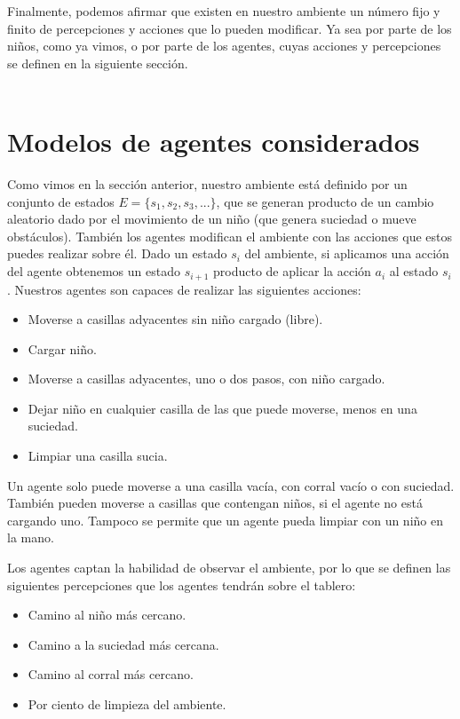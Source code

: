 \documentclass[twoside]{article}
\begin{document}
Finalmente, podemos afirmar que existen en nuestro ambiente un n\'umero fijo y finito de percepciones y acciones que lo pueden modificar. Ya sea por parte de los ni\~nos, como ya vimos, o por parte de los agentes, cuyas acciones y percepciones se definen en la siguiente secci\'on.\\\\

\section{Modelos de agentes considerados}
Como vimos en la secci\'on anterior, nuestro ambiente est\'a definido por un conjunto de estados $E =\{s_1, s_2, s_3,...\}$, que se generan producto de un cambio aleatorio dado por el movimiento de un ni\~no (que genera suciedad o mueve obst\'aculos). Tambi\'en los agentes modifican el ambiente con las acciones que estos puedes realizar sobre \'el. Dado un estado $s_i$ del ambiente, si aplicamos una acci\'on del agente obtenemos un estado $s_{i+1}$ producto de aplicar la acci\'on $a_i$ al estado $s_i$. Nuestros agentes son capaces de realizar las siguientes acciones:
\begin{itemize}
\item Moverse a casillas adyacentes sin ni\~no cargado (libre).
\item Cargar ni\~no.
\item Moverse a casillas adyacentes, uno o dos pasos, con ni\~no cargado.
\item Dejar ni\~no en cualquier casilla de las que puede moverse, menos en una suciedad.
\item Limpiar una casilla sucia.
\end{itemize}

Un agente solo puede moverse a una casilla vac\'ia, con corral vac\'io o con suciedad. Tambi\'en pueden moverse a casillas que contengan ni\~nos, si el agente no est\'a cargando uno. Tampoco se permite que un agente pueda limpiar con un ni\~no en la mano.

Los agentes captan la habilidad de observar el ambiente, por lo que se definen las siguientes percepciones que los agentes tendr\'an sobre el tablero:
\begin{itemize}
\item Camino al ni\~no m\'as cercano.
\item Camino a la suciedad m\'as cercana.
\item Camino al corral m\'as cercano.
\item Por ciento de limpieza del ambiente.
\end{itemize}
\end{document}

